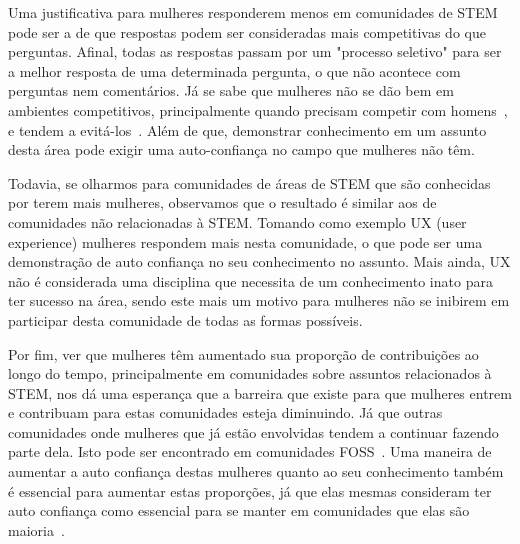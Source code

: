 Uma justificativa para mulheres responderem menos em comunidades de STEM pode ser a de que respostas podem ser consideradas mais competitivas do que perguntas. Afinal, todas as respostas passam por um "processo seletivo" para ser a melhor resposta de uma determinada pergunta, o que não acontece com perguntas nem comentários. Já se sabe que mulheres não se dão bem em ambientes competitivos, principalmente quando precisam competir com homens~\cite{gneezy2003performance}, e tendem a evitá-los~\cite{niederle2005women,croson2009gender}. Além de que, demonstrar conhecimento em um assunto desta área pode exigir uma auto-confiança no campo que mulheres não têm.

Todavia, se olharmos para comunidades de áreas de STEM que são conhecidas por terem mais mulheres, observamos que o resultado é similar aos de comunidades não relacionadas à STEM. Tomando como exemplo UX (user experience) mulheres respondem mais nesta comunidade, o que pode ser uma demonstração de auto confiança no seu conhecimento no assunto. Mais ainda, UX não é considerada uma disciplina que necessita de um conhecimento inato para ter sucesso na área, sendo este mais um motivo para mulheres não se inibirem em participar desta comunidade de todas as formas possíveis. 

Por fim, ver que mulheres têm aumentado sua proporção de contribuições ao longo do tempo, principalmente em comunidades sobre assuntos relacionados à STEM, nos dá uma esperança que a barreira que existe para que mulheres entrem e contribuam para estas comunidades esteja diminuindo. Já que outras comunidades onde mulheres que já estão envolvidas tendem a continuar fazendo parte dela. Isto pode ser encontrado em comunidades FOSS~\cite{powell2010gender}. Uma maneira de aumentar a auto confiança destas mulheres quanto ao seu conhecimento também é essencial para aumentar estas proporções, já que elas mesmas consideram ter auto confiança como essencial para se manter em comunidades que elas são maioria~\cite{powell2010gender}.




